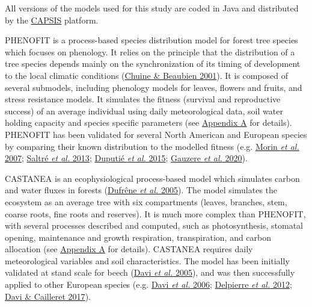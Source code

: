 \documentclass[11pt,]{article}
\begin{document}
All versions of the models used for this study are coded in Java and
distributed by the \href{https://capsis.cirad.fr/capsis/home}{CAPSIS}
platform.

PHENOFIT is a process-based species distribution model for forest tree
species which focuses on phenology. It relies on the principle that the
distribution of a tree species depends mainly on the synchronization of
its timing of development to the local climatic conditions
(\protect\hyperlink{ref-Chuine2001}{Chuine \& Beaubien 2001}). It is
composed of several submodels, including phenology models for leaves,
flowers and fruits, and stress resistance models. It simulates the
fitness (survival and reproductive success) of an average individual
using daily meteorological data, soil water holding capacity and species
specific parameters (see \protect\hyperlink{appendixA}{Appendix A} for
details). PHENOFIT has been validated for several North American and
European species by comparing their known distribution to the modelled
fitness (e.g. \protect\hyperlink{ref-Morin2007}{Morin \emph{et al.}
2007}; \protect\hyperlink{ref-Saltre2013}{Saltré \emph{et al.} 2013};
\protect\hyperlink{ref-Duputie2015}{Duputié \emph{et al.} 2015};
\protect\hyperlink{ref-Gauzere2020}{Gauzere \emph{et al.} 2020}).

CASTANEA is an ecophysiological process-based model which simulates
carbon and water fluxes in forests
(\protect\hyperlink{ref-Dufrene2005}{Dufrêne \emph{et al.} 2005}). The
model simulates the ecosystem as an average tree with six compartments
(leaves, branches, stem, coarse roots, fine roots and reserves). It is
much more complex than PHENOFIT, with several processes described and
computed, such as photosynthesis, stomatal opening, maintenance and
growth respiration, transpiration, and carbon allocation (see
\protect\hyperlink{appendixA}{Appendix A} for details). CASTANEA
requires daily meteorological variables and soil characteristics. The
model has been initially validated at stand scale for beech
(\protect\hyperlink{ref-Davi2005}{Davi \emph{et al.} 2005}), and was
then successfully applied to other European species (e.g.
\protect\hyperlink{ref-Davi2006}{Davi \emph{et al.} 2006};
\protect\hyperlink{ref-Delpierre2012}{Delpierre \emph{et al.} 2012};
\protect\hyperlink{ref-Davi2017}{Davi \& Cailleret 2017}).
\end{document}
